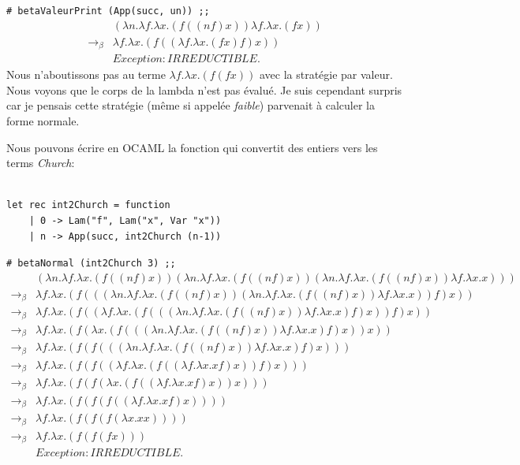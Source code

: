 \documentclass[11pt]{book}
\begin{document}
\verb+# betaValeurPrint (App(succ, un)) ;;+
$$
\begin{array}{ll}
& (\lambda n . \lambda f . \lambda x . (f((nf)x))\lambda f . \lambda x . (fx))   \\
\rightarrow _\beta & \lambda f . \lambda x . (f((\lambda f . \lambda x . (fx)f)x))   \\
& Exception: IRREDUCTIBLE.
\end{array} 
$$
Nous n'aboutissons pas au terme $\lambda f . \lambda x . (f(fx)) $ avec la stratégie par valeur. Nous voyons que le corps de la lambda
n'est pas évalué. Je suis cependant surpris car je pensais cette stratégie (même si appelée \textit{faible}) parvenait à calculer la
forme normale.

Nous pouvons écrire en OCAML la fonction qui convertit des entiers vers les terms \textit{Church}:
\begin{Verbatim}

let rec int2Church = function
	| 0 -> Lam("f", Lam("x", Var "x"))
	| n -> App(succ, int2Church (n-1))
\end{Verbatim}

\verb+# betaNormal (int2Church 3) ;;+
$$
\begin{array}{ll}
 & (\lambda n . \lambda f . \lambda x . (f((nf)x))(\lambda n . \lambda f . \lambda x . (f((nf)x))(\lambda n . \lambda f . \lambda x . (f((nf)x))\lambda f . \lambda x . x)))   \\
\rightarrow _\beta & \lambda f . \lambda x . (f(((\lambda n . \lambda f . \lambda x . (f((nf)x))(\lambda n . \lambda f . \lambda x . (f((nf)x))\lambda f . \lambda x . x))f)x))   \\
\rightarrow _\beta & \lambda f . \lambda x . (f((\lambda f . \lambda x . (f(((\lambda n . \lambda f . \lambda x . (f((nf)x))\lambda f . \lambda x . x)f)x))f)x))   \\
\rightarrow _\beta & \lambda f . \lambda x . (f(\lambda x . (f(((\lambda n . \lambda f . \lambda x . (f((nf)x))\lambda f . \lambda x . x)f)x))x))   \\
\rightarrow _\beta & \lambda f . \lambda x . (f(f(((\lambda n . \lambda f . \lambda x . (f((nf)x))\lambda f . \lambda x . x)f)x)))   \\
\rightarrow _\beta & \lambda f . \lambda x . (f(f((\lambda f . \lambda x . (f((\lambda f . \lambda x . xf)x))f)x)))   \\
\rightarrow _\beta & \lambda f . \lambda x . (f(f(\lambda x . (f((\lambda f . \lambda x . xf)x))x)))   \\
\rightarrow _\beta & \lambda f . \lambda x . (f(f(f((\lambda f . \lambda x . xf)x))))   \\
\rightarrow _\beta & \lambda f . \lambda x . (f(f(f(\lambda x . xx))))   \\
\rightarrow _\beta & \lambda f . \lambda x . (f(f(fx)))   \\
& Exception: IRREDUCTIBLE. 
\end{array}
$$
\end{document}

